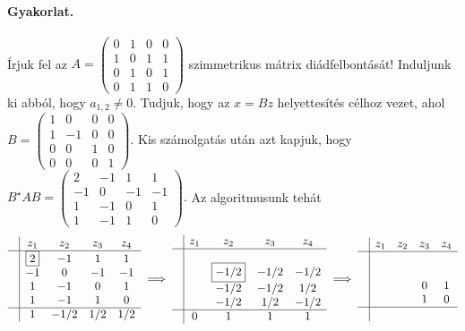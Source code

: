 \documentclass[a4paper, showtrims]{memoir}
\theoremstyle{plain}
\theoremstyle{remark}
\theoremstyle{definition}
\begin{document}
\paragraph{Gyakorlat.}
Írjuk fel az 
\(
A=
\begin{pmatrix}
    0&1&0&0\\
    1&0&1&1\\
    0&1&0&1\\
    0&1&1&0
\end{pmatrix}
\)
szimmetrikus mátrix diádfelbontását!
Induljunk ki abból, hogy $a_{1,2}\neq 0$. Tudjuk, hogy az $x=Bz$ helyettesítés célhoz vezet, ahol
\(
B=
\begin{pmatrix}
    1&0&0&0\\
    1&-1&0&0\\
    0&0&1&0\\
    0&0&0&1
\end{pmatrix}.
\)
Kis számolgatás után azt kapjuk, hogy 
\(
B^\star AB=
\begin{pmatrix}
    2&-1&1&1\\
    -1&0&-1&-1\\
    1&-1&0&1\\
    1&-1&1&0
\end{pmatrix}.
\)
Az algoritmusunk tehát
\[
\begin{array}{c|cccc}
     & z_1       & z_2 & z_3 & z_4\\
     \hline
     & \boxed{2} & -1   & 1 &1  \\
     & -1         & 0   & -1 &-1   \\
     & 1         & -1   & 0 &1  \\
     & 1         & -1   & 1 &0  \\
    \hline
    & 1     & -1/2   & 1/2 & 1/2
\end{array}
\implies
\begin{array}{c|cccc}
     & z_1& z_2  & z_3 &z_4 \\
     \hline
     & &                &  &   \\
     & & \boxed{-1/2}      & -1/2 &-1/2   \\
     & & -1/2              & -1/2 &1/2   \\
     & & -1/2              & 1/2 &-1/2   \\
     \hline
     &0 & 1         & 1 & 1
\end{array}
\implies
\begin{array}{c|cccc}
     & z_1 & z_2 & z_3 & z_4      \\
     \hline
     &     &     &     &      \\
     &     &     &     &      \\
     &     &     &  0  & 1 \\
     &     &     &  1  & 0 \\
    \hline
     &     &     &     &
\end{array}
\]
\end{document}
